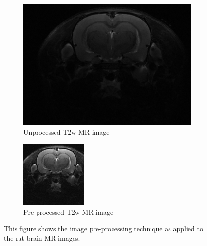 \begin{figure}
\centering
\begin{subfigure}{.5\textwidth}
  \centering
  \includegraphics[width=0.9\linewidth]{MRI_veh01.png}
  \caption{Unprocessed T2w MR image }
  \label{fig:unprocessedMRI}
\end{subfigure}%
\begin{subfigure}{.5\textwidth}
  \centering
  \includegraphics[width=0.8\linewidth]{post_MRI_veh01.png}
  \caption{Pre-processed T2w MR image}
  \label{fig:processedMRI}
\end{subfigure}
\caption{This figure shows the image pre-processing technique as applied to the rat brain MR images.}
\label{fig:procvsUnproccMRI}
\end{figure}

